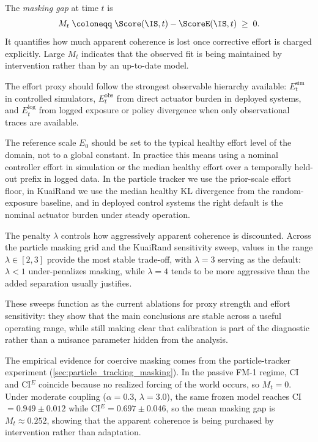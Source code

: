 \begin{definition}\label{def:masking_gap}
The \emph{masking gap} at time $t$ is
\[
  M_t
  \;\coloneqq\;
  \Score(\IS,t) - \ScoreE(\IS,t)
  \;\geq\; 0.
\]
It quantifies how much apparent coherence is lost once corrective effort is
charged explicitly. Large $M_t$ indicates that the observed fit is being
maintained by intervention rather than by an up-to-date model.
\end{definition}

\begin{remark}
The effort proxy should follow the strongest observable hierarchy available:
$E_t^{\mathrm{sim}}$ in controlled simulators,
$E_t^{\mathrm{obs}}$ from direct actuator burden in deployed systems, and
$E_t^{\mathrm{log}}$ from logged exposure or policy divergence when only
observational traces are available.

The reference scale $E_0$ should be set to the typical healthy effort level of
the domain, not to a global constant. In practice this means using a nominal
controller effort in simulation or the median healthy effort over a temporally
held-out prefix in logged data. In the particle tracker we use the prior-scale
effort floor, in KuaiRand we use the median healthy KL divergence from the
random-exposure baseline, and in deployed control systems the right default is
the nominal actuator burden under steady operation.

The penalty $\lambda$ controls how aggressively apparent coherence is discounted.
Across the particle masking grid and the KuaiRand sensitivity sweep, values in
the range $\lambda \in [2,3]$ provide the most stable trade-off, with
$\lambda = 3$ serving as the default: $\lambda < 1$ under-penalizes
masking, while $\lambda = 4$ tends to be more aggressive than the added
separation usually justifies.

These sweeps function as the current ablations for proxy strength and
effort sensitivity: they show that the main conclusions are stable across a
useful operating range, while still making clear that calibration is part of the
diagnostic rather than a nuisance parameter hidden from the analysis.
\end{remark}

The empirical evidence for coercive masking comes from the particle-tracker experiment
(\cref{sec:particle_tracking_masking}). In the passive FM-1 regime, CI and
CI$^E$ coincide because no realized forcing of the world occurs, so $M_t=0$.
Under moderate coupling ($\alpha = 0.3$, $\lambda = 3.0$), the same frozen
model reaches CI $= 0.949 \pm 0.012$ while
CI$^E = 0.697 \pm 0.046$, so the mean masking gap is
$M_t \approx 0.252$, showing that the apparent coherence is being purchased by
intervention rather than adaptation.
